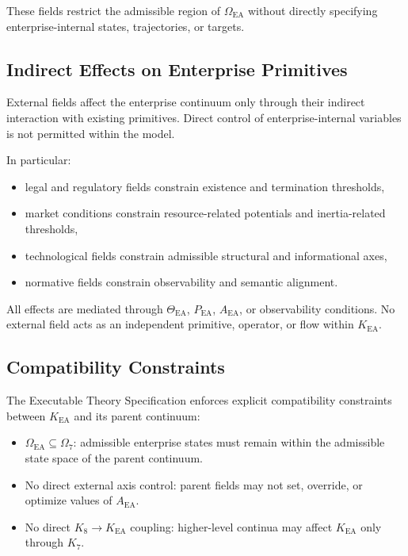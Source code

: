 These fields restrict the admissible region of
$\Omega_{\mathrm{EA}}$ without directly specifying enterprise-internal
states, trajectories, or targets.

\subsection{Indirect Effects on Enterprise Primitives}

External fields affect the enterprise continuum only through their
indirect interaction with existing primitives.
Direct control of enterprise-internal variables is not permitted within
the model.

In particular:
\begin{itemize}
  \item legal and regulatory fields constrain existence and termination
        thresholds,
  \item market conditions constrain resource-related potentials and
        inertia-related thresholds,
  \item technological fields constrain admissible structural and
        informational axes,
  \item normative fields constrain observability and semantic alignment.
\end{itemize}

All effects are mediated through $\Theta_{\mathrm{EA}}$,
$P_{\mathrm{EA}}$, $A_{\mathrm{EA}}$, or observability conditions.
No external field acts as an independent primitive, operator, or flow
within $K_{\mathrm{EA}}$.

\subsection{Compatibility Constraints}

The Executable Theory Specification enforces explicit compatibility
constraints between $K_{\mathrm{EA}}$ and its parent continuum:

\begin{itemize}
  \item $\Omega_{\mathrm{EA}} \subseteq \Omega_{7}$: admissible enterprise
        states must remain within the admissible state space of the
        parent continuum.
  \item No direct external axis control: parent fields may not set,
        override, or optimize values of $A_{\mathrm{EA}}$.
  \item No direct $K_8 \rightarrow K_{\mathrm{EA}}$ coupling: higher-level
        continua may affect $K_{\mathrm{EA}}$ only through $K_7$.
\end{itemize}

